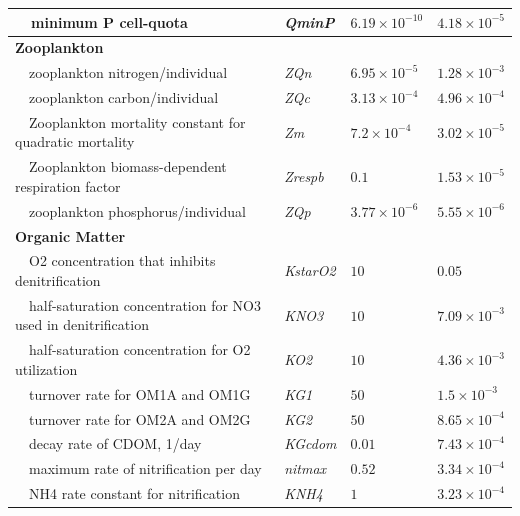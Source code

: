 \documentclass[letterpaper,12pt,oneside]{article}\usepackage[]{graphicx}\usepackage[]{color}
\begin{document}
\begin{table}[!tbp]
{\begin{center}
\begin{tabular}{llll}
~~minimum P cell-quota&\textit{QminP}&$6.19\times 10^{-10}$&$4.18\times 10^{-5}$\tabularnewline
\hline
{\bfseries Zooplankton}&&&\tabularnewline
~~zooplankton nitrogen/individual&\textit{ZQn}&$6.95\times 10^{-5}$&$1.28\times 10^{-3}$\tabularnewline
~~zooplankton carbon/individual&\textit{ZQc}&$3.13\times 10^{-4}$&$4.96\times 10^{-4}$\tabularnewline
~~Zooplankton mortality constant for quadratic mortality&\textit{Zm}&$7.2\times 10^{-4}$&$3.02\times 10^{-5}$\tabularnewline
~~Zooplankton biomass-dependent respiration factor&\textit{Zrespb}&$0.1$&$1.53\times 10^{-5}$\tabularnewline
~~zooplankton phosphorus/individual&\textit{ZQp}&$3.77\times 10^{-6}$&$5.55\times 10^{-6}$\tabularnewline
\hline
{\bfseries Organic Matter}&&&\tabularnewline
~~O2 concentration that inhibits denitrification&\textit{KstarO2}&$10$&$0.05$\tabularnewline
~~half-saturation concentration for NO3 used in denitrification&\textit{KNO3}&$10$&$7.09\times 10^{-3}$\tabularnewline
~~half-saturation concentration for O2 utilization&\textit{KO2}&$10$&$4.36\times 10^{-3}$\tabularnewline
~~turnover rate for OM1A and OM1G&\textit{KG1}&$50$&$1.5\times 10^{-3}$\tabularnewline
~~turnover rate for OM2A and OM2G&\textit{KG2}&$50$&$8.65\times 10^{-4}$\tabularnewline
~~decay rate of CDOM, 1/day&\textit{KGcdom}&$0.01$&$7.43\times 10^{-4}$\tabularnewline
~~maximum rate of nitrification per day&\textit{nitmax}&$0.52$&$3.34\times 10^{-4}$\tabularnewline
~~NH4 rate constant for nitrification&\textit{KNH4}&$1$&$3.23\times 10^{-4}$\tabularnewline
\hline
\end{tabular}\end{center}}

\end{table}
\end{document}
